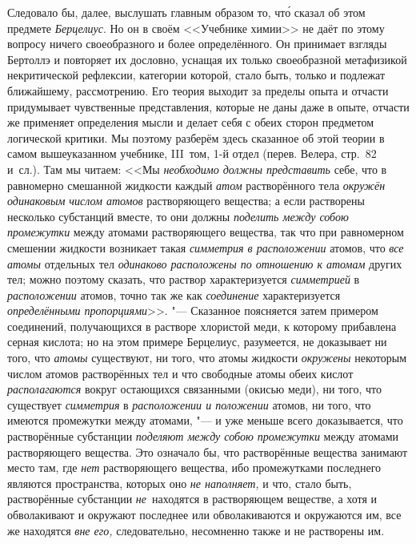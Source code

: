 Следовало бы, далее, выслушать главным образом то, чт\'{о} сказал об этом
предмете {\em Берцелиус}. Но он в своём <<Учебнике химии>> не даёт по этому
вопросу ничего своеобразного и более определённого. Он принимает взгляды
Бертоллэ и повторяет их дословно, уснащая их только своеобразной метафизикой
некритической рефлексии, категории которой, стало быть, только и подлежат
ближайшему, рассмотрению. Его теория выходит за пределы опыта и отчасти
придумывает чувственные представления, которые не даны даже в опыте, отчасти же
применяет определения мысли и делает себя с обеих сторон предметом логической
критики. Мы поэтому разберём здесь сказанное об этой теории в самом
вышеуказанном учебнике, III~том, 1-й отдел (перев. Велера, стр.~82 и~сл.). Там
мы читаем: <<Мы {\em необходимо должны представить} себе, что в равномерно
смешанной жидкости каждый {\em атом} растворённого тела
{\em окружён одинаковым числом атомов} растворяющего вещества; а если
растворены несколько субстанций вместе, то они должны {\em поделить между собою
промежутки} между атомами растворяющего вещества, так что при равномерном
смешении жидкости возникает такая {\em симметрия в расположении} атомов, что
{\em все атомы} отдельных тел {\em одинаково расположены по отношению к атомам}
других тел; можно поэтому сказать, что раствор характеризуется {\em симметрией}
в {\em расположении} атомов, точно так же как {\em соединение} характеризуется
{\em определёнными пропорциями}>>. "--- Сказанное поясняется затем примером
соединений, получающихся в растворе хлористой меди, к которому прибавлена
серная кислота; но на этом примере Берцелиус, разумеется, не доказывает ни
того, что {\em атомы} существуют, ни того, что атомы жидкости {\em окружены}
некоторым числом атомов растворённых тел и что свободные атомы обеих кислот
{\em располагаются} вокруг остающихся связанными (окисью меди), ни того, что
существует {\em симметрия} в {\em расположении и положении} атомов, ни того,
что имеются промежутки между атомами, "--- и уже меньше всего доказывается, что
растворённые субстанции {\em поделяют между собою промежутки} между атомами
растворяющего вещества. Это означало бы, что растворённые вещества занимают
место там, где {\em нет} растворяющего вещества, ибо промежутками последнего
являются пространства, которых оно {\em не наполняет,} и что, стало быть,
растворённые субстанции {\em не}~находятся в растворяющем веществе, а хотя и
обволакивают и окружают последнее или обволакиваются и окружаются им, все же
находятся {\em вне его,} следовательно, несомненно также и не растворены им.
